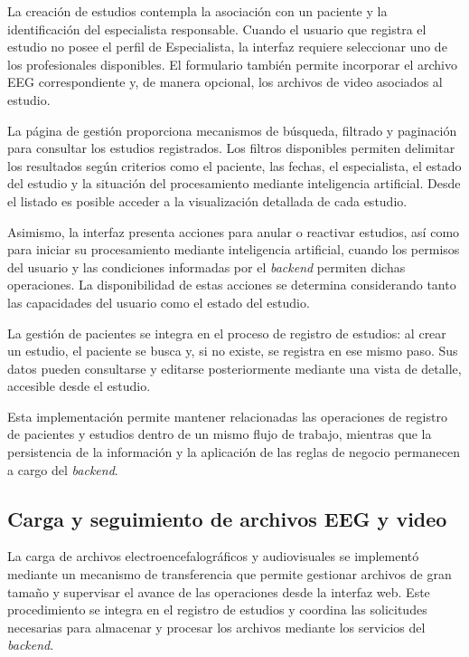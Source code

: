 La creación de estudios contempla la
asociación con un paciente y la identificación
del especialista responsable. Cuando el
usuario que registra el estudio no posee
el perfil de Especialista, la interfaz requiere
seleccionar uno de los profesionales
disponibles. El formulario también permite
incorporar el archivo EEG correspondiente
y, de manera opcional, los archivos de video
asociados al estudio.

La página de gestión proporciona mecanismos
de búsqueda, filtrado y paginación para
consultar los estudios registrados.
Los filtros disponibles permiten delimitar
los resultados según criterios como el
paciente, las fechas, el especialista,
el estado del estudio y la situación
del procesamiento mediante inteligencia
artificial. Desde el listado es posible
acceder a la visualización detallada
de cada estudio.

Asimismo, la interfaz presenta acciones
para anular o reactivar estudios, así como
para iniciar su procesamiento mediante
inteligencia artificial, cuando los permisos
del usuario y las condiciones informadas
por el \textit{backend} permiten dichas operaciones.
La disponibilidad de estas acciones se
determina considerando tanto las capacidades
del usuario como el estado del estudio.

La gestión de pacientes se integra en el proceso de registro de
estudios: al crear un estudio, el paciente se busca y, si no existe,
se registra en ese mismo paso. Sus datos pueden consultarse y editarse
posteriormente mediante una vista de detalle, accesible desde el estudio.

Esta implementación permite mantener
relacionadas las operaciones de registro
de pacientes y estudios dentro de un
mismo flujo de trabajo, mientras que
la persistencia de la información y
la aplicación de las reglas de negocio
permanecen a cargo del \textit{backend}.


\subsection{Carga y seguimiento de archivos EEG y video}

La carga de archivos electroencefalográficos
y audiovisuales se implementó mediante un
mecanismo de transferencia que permite gestionar
archivos de gran tamaño y supervisar el avance
de las operaciones desde la interfaz web.
Este procedimiento se integra en el registro
de estudios y coordina las solicitudes
necesarias para almacenar y procesar los
archivos mediante los servicios del \textit{backend}.

